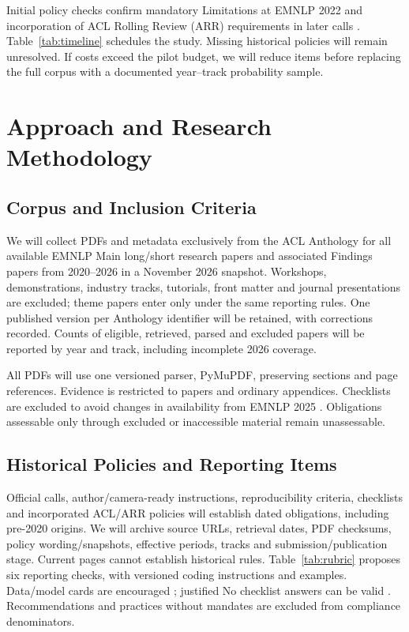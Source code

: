 \documentclass[11pt]{article}
\begin{document}
Initial policy checks confirm mandatory Limitations at EMNLP 2022 \cite{emnlp2022cfp} and incorporation of ACL Rolling Review (ARR) requirements in later calls \cite{emnlp2025cfp,emnlp2026cfp}. Table~\ref{tab:timeline} schedules the study. Missing historical policies will remain unresolved. If costs exceed the pilot budget, we will reduce items before replacing the full corpus with a documented year--track probability sample.

\section{Approach and Research Methodology}
\label{sec:methods}
\subsection{Corpus and Inclusion Criteria}
We will collect PDFs and metadata exclusively from the ACL Anthology for all available EMNLP Main long/short research papers and associated Findings papers from 2020--2026 in a November 2026 snapshot. Workshops, demonstrations, industry tracks, tutorials, front matter and journal presentations are excluded; theme papers enter only under the same reporting rules. One published version per Anthology identifier will be retained, with corrections recorded. Counts of eligible, retrieved, parsed and excluded papers will be reported by year and track, including incomplete 2026 coverage.

All PDFs will use one versioned parser, PyMuPDF, preserving sections and page references. Evidence is restricted to papers and ordinary appendices. Checklists are excluded to avoid changes in availability from EMNLP 2025 \cite{arrpublic2025}. Obligations assessable only through excluded or inaccessible material remain unassessable.

\subsection{Historical Policies and Reporting Items}
Official calls, author/camera-ready instructions, reproducibility criteria, checklists and incorporated ACL/ARR policies will establish dated obligations, including pre-2020 origins. We will archive source URLs, retrieval dates, PDF checksums, policy wording/snapshots, effective periods, tracks and submission/publication stage. Current pages cannot establish historical rules. Table~\ref{tab:rubric} proposes six reporting checks, with versioned coding instructions and examples. Data/model cards are encouraged \cite{arrchecklist}; justified No checklist answers can be valid \cite{arrresponsible}. Recommendations and practices without mandates are excluded from compliance denominators.
\end{document}
